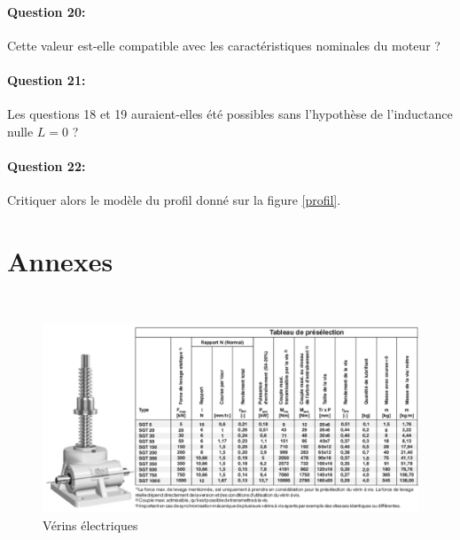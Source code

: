 \paragraph{Question 20:} Cette valeur est-elle compatible avec les caractéristiques nominales du moteur ?

\paragraph{Question 21:} Les questions 18 et 19 auraient-elles été possibles sans l'hypothèse de l'inductance nulle $L=0$ ?

\paragraph{Question 22:} Critiquer alors le modèle du profil donné sur la figure \ref{profil}.

\newpage

\section{Annexes}

~\

\begin{figure}[!h]
\centering
\includegraphics[width=0.8\linewidth]{img/fig6}
\caption{Vérins électriques}
\label{fig6}
\end{figure}

~\


